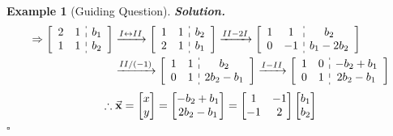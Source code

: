 \documentclass[12pt, a4paper]{article}
\newtheorem{eg}{Example}[subsection]
\newenvironment*{sol}{\par\indent\textbf{\textit{Solution. }}}{\hfill{$\square$}\par}
\def\vecx{\va{x}}
\begin{document}
\begin{eg}[Guiding Question]
\begin{sol}
		\[\begin{aligned}\Rightarrow\left[\begin{array}{c:c}\begin{matrix}2&1\\1&1\end{matrix}&\begin{matrix}b_1\\b_2\end{matrix}\end{array}\right]&\xrightarrow[]{I\leftrightarrow II}\left[\begin{array}{c:c}\begin{matrix}1&1\\2&1\end{matrix}&\begin{matrix}b_2\\b_1\end{matrix}\end{array}\right]\xrightarrow[]{II-2I}\left[\begin{array}{c:c}\begin{matrix}1&1\\0&-1\end{matrix}&\begin{matrix}b_2\\b_1-2b_2\end{matrix}\end{array}\right]\\&\xrightarrow[]{II/(-1)}\left[\begin{array}{c:c}\begin{matrix}1&1\\0&1\end{matrix}&\begin{matrix}b_2\\2b_2-b_1\end{matrix}\end{array}\right]\xrightarrow[]{I-II}\left[\begin{array}{c:c}\begin{matrix}1&0\\0&1\end{matrix}&\begin{matrix}-b_2+b_1\\2b_2-b_1\end{matrix}\end{array}\right]\end{aligned}\]
		\[\therefore\vecx=\begin{bmatrix}x\\y\end{bmatrix}=\begin{bmatrix}-b_2+b_1\\2b_2-b_1\end{bmatrix}=\begin{bmatrix}1&-1\\-1&2\end{bmatrix}\begin{bmatrix}b_1\\b_2\end{bmatrix}\]
	\end{sol}
\end{eg}
\end{document}
